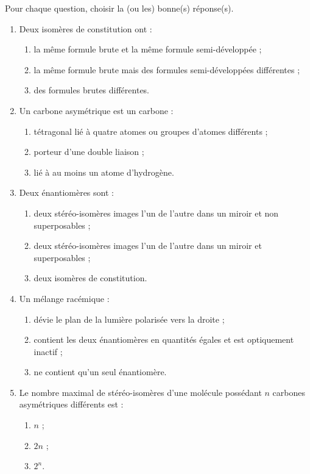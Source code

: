 \documentclass[11pt]{article}
\begin{document}
\begin{exercice}
Pour chaque question, choisir la (ou les) bonne(s) réponse(s).
\begin{enumerate}
\item Deux isomères de constitution ont :
\begin{enumerate}
\item la même formule brute et la même formule semi-développée ;
\item la même formule brute mais des formules semi-développées différentes ;
\item des formules brutes différentes.
\end{enumerate}
\item Un carbone asymétrique est un carbone :
\begin{enumerate}
\item tétragonal lié à quatre atomes ou groupes d'atomes différents ;
\item porteur d'une double liaison ;
\item lié à au moins un atome d'hydrogène.
\end{enumerate}
\item Deux énantiomères sont :
\begin{enumerate}
\item deux stéréo-isomères images l'un de l'autre dans un miroir et non superposables ;
\item deux stéréo-isomères images l'un de l'autre dans un miroir et superposables ;
\item deux isomères de constitution.
\end{enumerate}
\item Un mélange racémique :
\begin{enumerate}
\item dévie le plan de la lumière polarisée vers la droite ;
\item contient les deux énantiomères en quantités égales et est optiquement inactif ;
\item ne contient qu'un seul énantiomère.
\end{enumerate}
\item Le nombre maximal de stéréo-isomères d'une molécule possédant $n$ carbones asymétriques différents est :
\begin{enumerate}
\item $n$ ; \item $2n$ ; \item $2^n$.
\end{enumerate}
\end{enumerate}
\end{exercice}
\end{document}
